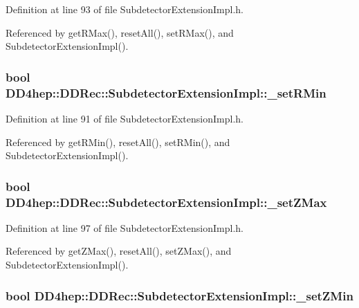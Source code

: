 Definition at line 93 of file SubdetectorExtensionImpl.h.

Referenced by getRMax(), resetAll(), setRMax(), and SubdetectorExtensionImpl().\hypertarget{class_d_d4hep_1_1_d_d_rec_1_1_subdetector_extension_impl_aa2540f465262ee20af21a1dae2a33f12}{
\subsubsection[{\_\-setRMin}]{\setlength{\rightskip}{0pt plus 5cm}bool {\bf DD4hep::DDRec::SubdetectorExtensionImpl::\_\-setRMin}}}
\label{class_d_d4hep_1_1_d_d_rec_1_1_subdetector_extension_impl_aa2540f465262ee20af21a1dae2a33f12}


Definition at line 91 of file SubdetectorExtensionImpl.h.

Referenced by getRMin(), resetAll(), setRMin(), and SubdetectorExtensionImpl().\hypertarget{class_d_d4hep_1_1_d_d_rec_1_1_subdetector_extension_impl_a6e86e2a12196aff1d36c2b79146c9a1b}{
\subsubsection[{\_\-setZMax}]{\setlength{\rightskip}{0pt plus 5cm}bool {\bf DD4hep::DDRec::SubdetectorExtensionImpl::\_\-setZMax}}}
\label{class_d_d4hep_1_1_d_d_rec_1_1_subdetector_extension_impl_a6e86e2a12196aff1d36c2b79146c9a1b}


Definition at line 97 of file SubdetectorExtensionImpl.h.

Referenced by getZMax(), resetAll(), setZMax(), and SubdetectorExtensionImpl().\hypertarget{class_d_d4hep_1_1_d_d_rec_1_1_subdetector_extension_impl_a7f2f6db8f2c5f98b732bcea3a452a12f}{
\subsubsection[{\_\-setZMin}]{\setlength{\rightskip}{0pt plus 5cm}bool {\bf DD4hep::DDRec::SubdetectorExtensionImpl::\_\-setZMin}}}
\label{class_d_d4hep_1_1_d_d_rec_1_1_subdetector_extension_impl_a7f2f6db8f2c5f98b732bcea3a452a12f}


